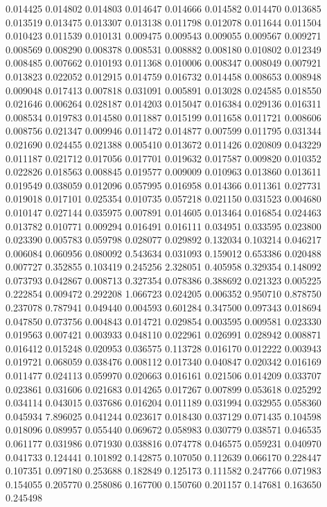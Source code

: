 0.014425
0.014802
0.014803
0.014647
0.014666
0.014582
0.014470
0.013685
0.013519
0.013475
0.013307
0.013138
0.011798
0.012078
0.011644
0.011504
0.010423
0.011539
0.010131
0.009475
0.009543
0.009055
0.009567
0.009271
0.008569
0.008290
0.008378
0.008531
0.008882
0.008180
0.010802
0.012349
0.008485
0.007662
0.010193
0.011368
0.010006
0.008347
0.008049
0.007921
0.013823
0.022052
0.012915
0.014759
0.016732
0.014458
0.008653
0.008948
0.009048
0.017413
0.007818
0.031091
0.005891
0.013028
0.024585
0.018550
0.021646
0.006264
0.028187
0.014203
0.015047
0.016384
0.029136
0.016311
0.008534
0.019783
0.014580
0.011887
0.015199
0.011658
0.011721
0.008606
0.008756
0.021347
0.009946
0.011472
0.014877
0.007599
0.011795
0.031344
0.021690
0.024455
0.021388
0.005410
0.013672
0.011426
0.020809
0.043229
0.011187
0.021712
0.017056
0.017701
0.019632
0.017587
0.009820
0.010352
0.022826
0.018563
0.008845
0.019577
0.009009
0.010963
0.013860
0.013611
0.019549
0.038059
0.012096
0.057995
0.016958
0.014366
0.011361
0.027731
0.019018
0.017101
0.025354
0.010735
0.057218
0.021150
0.031523
0.004680
0.010147
0.027144
0.035975
0.007891
0.014605
0.013464
0.016854
0.024463
0.013782
0.010771
0.009294
0.016491
0.016111
0.034951
0.033595
0.023800
0.023390
0.005783
0.059798
0.028077
0.029892
0.132034
0.103214
0.046217
0.006084
0.060956
0.080092
0.543634
0.031093
0.159012
0.653386
0.020488
0.007727
0.352855
0.103419
0.245256
2.328051
0.405958
0.329354
0.148092
0.073793
0.042867
0.008713
0.327354
0.078386
0.388692
0.021323
0.005225
0.222854
0.009472
0.292208
1.066723
0.024205
0.006352
0.950710
0.878750
0.237078
0.787941
0.049440
0.004593
0.601284
0.347500
0.097343
0.018694
0.047850
0.073756
0.004843
0.014721
0.029854
0.003595
0.009581
0.023330
0.019563
0.007421
0.003933
0.048110
0.022961
0.026991
0.028942
0.008871
0.016412
0.015248
0.020953
0.036575
0.113728
0.016170
0.012222
0.003943
0.019721
0.068059
0.038476
0.008112
0.017340
0.040847
0.020342
0.016169
0.011477
0.024113
0.059970
0.020663
0.016161
0.021506
0.014209
0.033707
0.023861
0.031606
0.021683
0.014265
0.017267
0.007899
0.053618
0.025292
0.034114
0.043015
0.037686
0.016204
0.011189
0.031994
0.032955
0.058360
0.045934
7.896025
0.041244
0.023617
0.018430
0.037129
0.071435
0.104598
0.018096
0.089957
0.055440
0.069672
0.058983
0.030779
0.038571
0.046535
0.061177
0.031986
0.071930
0.038816
0.074778
0.046575
0.059231
0.040970
0.041733
0.124441
0.101892
0.142875
0.107050
0.112639
0.066170
0.228447
0.107351
0.097180
0.253688
0.182849
0.125173
0.111582
0.247766
0.071983
0.154055
0.205770
0.258086
0.167700
0.150760
0.201157
0.147681
0.163650
0.245498
